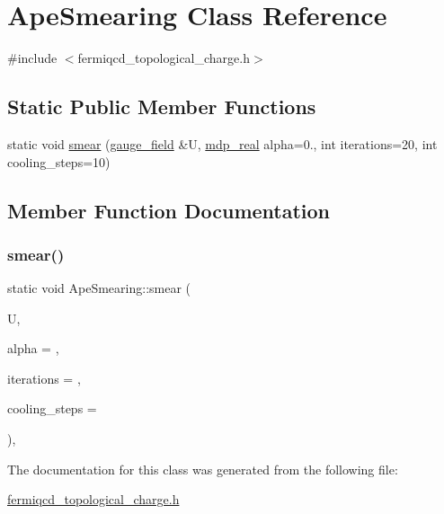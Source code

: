 \hypertarget{class_ape_smearing}{}\section{Ape\+Smearing Class Reference}
\label{class_ape_smearing}


{\ttfamily \#include $<$fermiqcd\+\_\+topological\+\_\+charge.\+h$>$}

\subsection*{Static Public Member Functions}
\begin{DoxyCompactItemize}
\item 
static void \hyperlink{class_ape_smearing_ab3f701b052e30d858bac389f639ed9a0}{smear} (\hyperlink{classgauge__field}{gauge\+\_\+field} \&U, \hyperlink{mdp__global__vars_8h_a69d96b74c791e0bbdb888b3913a69450}{mdp\+\_\+real} alpha=0., int iterations=20, int cooling\+\_\+steps=10)
\end{DoxyCompactItemize}


\subsection{Member Function Documentation}
\mbox{\label{class_ape_smearing_ab3f701b052e30d858bac389f639ed9a0}} 
\subsubsection{\texorpdfstring{smear()}{smear()}}
{\footnotesize\ttfamily static void Ape\+Smearing\+::smear (\begin{DoxyParamCaption}\item[{\hyperlink{classgauge__field}{gauge\+\_\+field} \&}]{U,  }\item[{\hyperlink{mdp__global__vars_8h_a69d96b74c791e0bbdb888b3913a69450}{mdp\+\_\+real}}]{alpha = {},  }\item[{int}]{iterations = {},  }\item[{int}]{cooling\+\_\+steps = {} }\end{DoxyParamCaption})\hspace{0.3cm}{\ttfamily [inline]}, {\ttfamily [static]}}



The documentation for this class was generated from the following file\+:\begin{DoxyCompactItemize}
\item 
\hyperlink{fermiqcd__topological__charge_8h}{fermiqcd\+\_\+topological\+\_\+charge.\+h}\end{DoxyCompactItemize}

